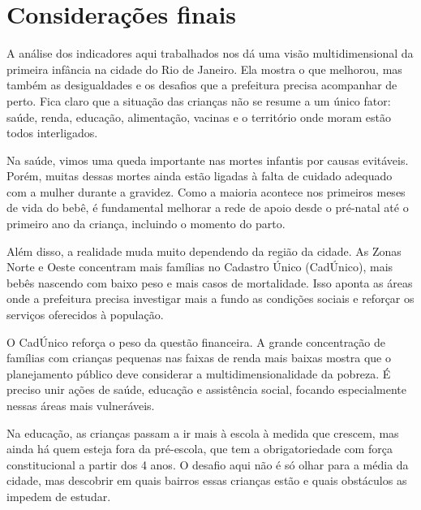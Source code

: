 
\chapter{Considerações finais}\label{cap:consideracoes}

A análise dos indicadores aqui trabalhados nos dá uma visão multidimensional da primeira infância na cidade do Rio de Janeiro. Ela mostra o que melhorou, mas também as desigualdades e os desafios que a prefeitura precisa acompanhar de perto. Fica claro que a situação das crianças não se resume a um único fator: saúde, renda, educação, alimentação, vacinas e o território onde moram estão todos interligados.

Na saúde, vimos uma queda importante nas mortes infantis por causas evitáveis. Porém, muitas dessas mortes ainda estão ligadas à falta de cuidado adequado com a mulher durante a gravidez. Como a maioria acontece nos primeiros meses de vida do bebê, é fundamental melhorar a rede de apoio desde o pré-natal até o primeiro ano da criança, incluindo o momento do parto.

Além disso, a realidade muda muito dependendo da região da cidade. As Zonas Norte e Oeste concentram mais famílias no Cadastro Único (CadÚnico), mais bebês nascendo com baixo peso e mais casos de mortalidade. Isso aponta as áreas onde a prefeitura precisa investigar mais a fundo as condições sociais e reforçar os serviços oferecidos à população.

O CadÚnico reforça o peso da questão financeira. A grande concentração de famílias com crianças pequenas nas faixas de renda mais baixas mostra que o planejamento público deve considerar a multidimensionalidade da pobreza. É preciso unir ações de saúde, educação e assistência social, focando especialmente nessas áreas mais vulneráveis.

Na educação, as crianças passam a ir mais à escola à medida que crescem, mas ainda há quem esteja fora da pré-escola, que tem a obrigatoriedade com força constitucional a partir dos 4 anos. O desafio aqui não é só olhar para a média da cidade, mas descobrir em quais bairros essas crianças estão e quais obstáculos as impedem de estudar.

